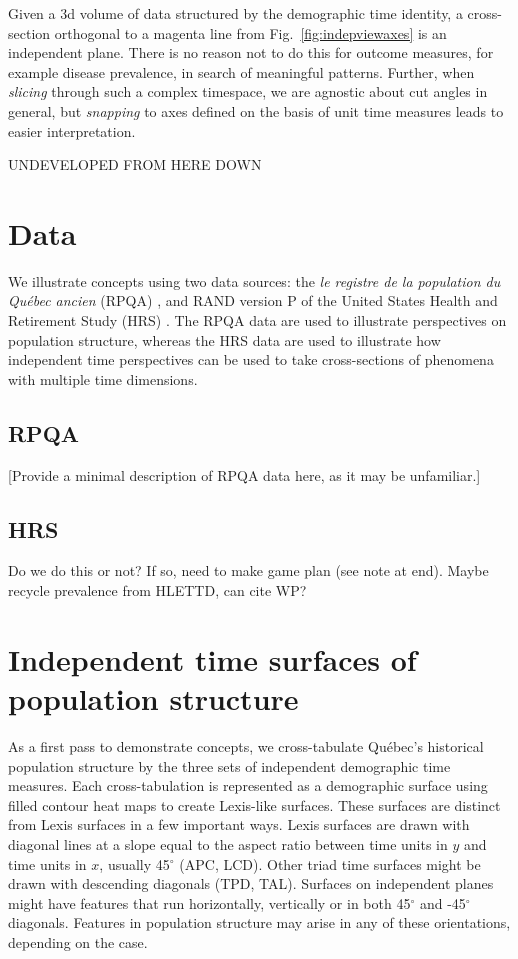 \documentclass{bmcart}
\begin{document}
Given a 3d volume of data structured by the demographic time identity, a cross-section orthogonal to a magenta line from Fig.~\ref{fig:indepviewaxes} is an independent plane. There is no reason not to do this for outcome measures, for example disease prevalence, in search of meaningful patterns. Further, when \emph{slicing} through such a complex timespace, we are agnostic about cut angles in general, but \emph{snapping} to axes defined on the basis of unit time measures leads to easier interpretation.

UNDEVELOPED FROM HERE DOWN

\section*{Data}
We illustrate concepts using two data sources: the \emph{le registre de la population du Qu\'{e}bec ancien} (RPQA) \citep{desjardins1998}, and RAND version P of the United States Health and Retirement Study (HRS) \citep{HRS, RAND}. The RPQA data are used to illustrate perspectives on population structure, whereas the HRS data are used to illustrate how independent time perspectives
can be used to take cross-sections of phenomena with multiple time dimensions.

\subsection*{RPQA}
[Provide a minimal description of RPQA data here, as it may be unfamiliar.]

\subsection*{HRS}
Do we do this or not? If so, need to make game plan (see note at end). Maybe recycle prevalence from HLETTD, can cite WP?

\section*{Independent time surfaces of population structure}
As a first pass to demonstrate concepts, we cross-tabulate Qu\'{e}bec's historical population structure by the three sets of independent demographic time measures. Each cross-tabulation is represented as a demographic surface using filled contour heat maps to create Lexis-like surfaces. These surfaces are distinct from Lexis surfaces in a few important ways. Lexis surfaces are drawn with diagonal lines at a slope equal to the aspect ratio between time units in $y$ and time units in $x$, usually 45$^\circ$ (APC, LCD). Other triad time surfaces might be drawn with descending diagonals (TPD, TAL). Surfaces on independent planes might have features that run horizontally, vertically or in both 45$^\circ$ and -45$^\circ$ diagonals. Features in population structure may arise in any of these orientations, depending on the case. 
\end{document}
